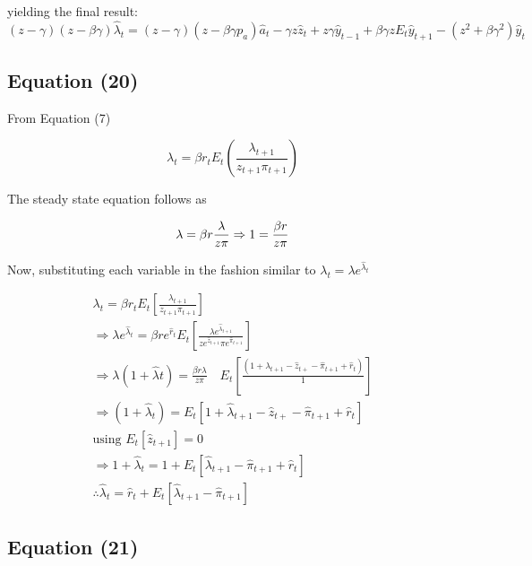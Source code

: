\documentclass[11pt,preprint, authoryear]{elsarticle}
\numberwithin{equation}{section}
\numberwithin{figure}{section}
\numberwithin{table}{section}
\begin{document}
yielding the final result:
\[(z-\gamma)(z-\beta \gamma) \hat{\lambda}_{t}=(z-\gamma)\left(z-\beta \gamma p_{a}\right) \hat{a}_{t}-\gamma z \hat{z}_{t}+z \gamma \hat{y}_{t-1}+\beta \gamma z E_{t} \hat{y}_{t+1}-\left(z^{2}+\beta \gamma^{2}\right) \hat{y}_{t}\]

\hypertarget{equation-20}{%
\subsection{Equation (20)}\label{equation-20}}

From Equation (7)

\[\lambda_{t}=\beta r_{t} E_{t}\left(\frac{\lambda_{t+1}}{z_{t+1} \pi_{t+1}}\right)\]

The steady state equation follows as

\[\lambda = \beta r \frac{\lambda} {z \pi} \\
\Rightarrow 1=\frac{\beta r} {z \pi}\]

Now, substituting each variable in the fashion similar to
\(\lambda_t = \lambda e^{\hat{\lambda}_t}\)

\[\begin{array}{l}
\lambda_{t}=\beta r_{t} E_{t}\left[\frac{\lambda_{t+1}}{z_{t+1} \pi_{t+1}}\right]\\
\Rightarrow \lambda e^{\hat{\lambda}_t}=\beta r e^{\hat{r}_{t}} E_{t}\left[\frac{\lambda e^{\hat{\lambda}_{t+1}}}{z e^{\hat{z}_{t+1}} \pi e^{\hat{\pi}_{t+1}}} \right]\\
\Rightarrow \lambda\left(1+\hat{\lambda}{t}\right)=\frac{\beta r \lambda}{z \pi} \quad E_{t}\left[\frac{\left(1+\hat{\lambda}_{t+1}-\hat{z}_{t+}-\hat{\pi}_{t+1}+\hat{r}_{t}\right)}{1}\right]\\
\Rightarrow \left(1+\hat{\lambda}_{t}\right)= E_{t}\left[1+\hat{\lambda}_{t+1}-\hat{z}_{t+}-\hat{\pi}_{t+1}+\hat{r}_{t}\right]\\
\text{using }{ E_t }[\hat{z}_{t+1}]=0\\
\Rightarrow 1+\hat{\lambda}_{t} = 1+E_{t}\left[\hat{\lambda}_{t+1}-\hat{\pi}_{t+1}+\hat{r}_{t}\right]\\
\therefore \hat{\lambda}_{t}=\hat{r}_{t}+E_{t}\left[\hat{\lambda}_{t+1} - \hat{\pi}_{t+1}\right]
\end{array}\]

\hypertarget{equation-21}{%
\subsection{Equation (21)}\label{equation-21}}
\end{document}
